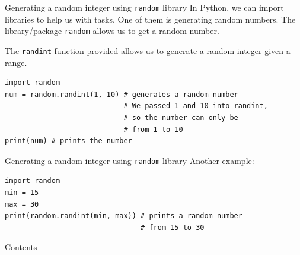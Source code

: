 \documentclass[dvipsnames, svgnames, x11names]{beamer}
\begin{document}
\begin{frame}[fragile]{Generating a random integer using \texttt{random} library}
In Python, we can import libraries to help us with tasks. One of them is generating random numbers.
The library/package \texttt{random} allows us to get a random number.

The \texttt{randint} function provided allows us to generate a random integer given a range.
\begin{verbatim}
import random
num = random.randint(1, 10) # generates a random number
                            # We passed 1 and 10 into randint,
                            # so the number can only be 
                            # from 1 to 10
print(num) # prints the number
\end{verbatim}
\end{frame}

\begin{frame}[fragile]{Generating a random integer using \texttt{random} library}
Another example:
\begin{verbatim}
import random
min = 15
max = 30
print(random.randint(min, max)) # prints a random number 
                                # from 15 to 30
\end{verbatim}
\end{frame}

\begin{frame}{Contents}

\begin{center}
\end{center}

\end{frame}
\end{document}
